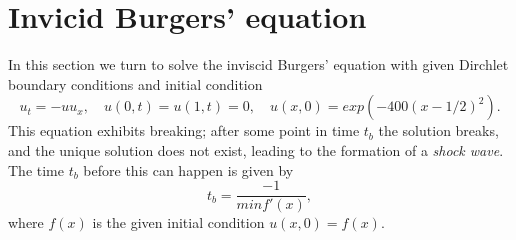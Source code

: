 
%
%    

\section{Invicid Burgers' equation}

In this section we turn to solve the inviscid Burgers' equation with given Dirchlet boundary conditions and initial condition
\begin{equation}
    u_t = -uu_x, \quad u(0, t) = u(1, t) = 0, \quad u(x, 0) = exp(-400(x-1/2)^2).
    \label{eq:burger}
\end{equation}
This equation exhibits breaking; 
after some point in time $t_b$ the solution breaks, 
and the unique solution does not exist, 
leading to the formation of a \textit{shock wave}.\cite{burgers} 
The time $t_b$ before this can happen is given by
\begin{equation}
    t_b = \frac{-1}{min f'(x)}, 
    \label{eq:t_break}
\end{equation}
where $f(x)$ is the given initial condition $u(x, 0) = f(x)$.\cite{burgers} 

